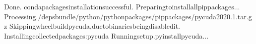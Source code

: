 \documentclass[a4paper,10pt,english]{sphinxmanual}
\begin{document}
\begin{sphinxVerbatim}[commandchars=\\\{\}]
\PYGZhy{}\PYGZhy{}\PYGZhy{}\PYGZhy{}\PYGZhy{}\PYGZhy{}\PYGZhy{}\PYGZhy{}\PYGZhy{}\PYGZhy{}\PYGZhy{}\PYGZhy{}\PYGZhy{}\PYGZhy{}\PYGZhy{}\PYGZhy{}\PYGZhy{}\PYGZhy{}\PYGZhy{}\PYGZhy{}\PYGZhy{}\PYGZhy{}\PYGZhy{}\PYGZhy{}\PYGZhy{}\PYGZhy{}\PYGZhy{}\PYGZhy{}\PYGZhy{}\PYGZhy{}\PYGZhy{}\PYGZhy{}\PYGZhy{}\PYGZhy{}\PYGZhy{}\PYGZhy{}\PYGZhy{}\PYGZhy{}\PYGZhy{}\PYGZhy{}\PYGZhy{}\PYGZhy{}\PYGZhy{}\PYGZhy{}\PYGZhy{}\PYGZhy{}\PYGZhy{}\PYGZhy{}\PYGZhy{}\PYGZhy{}\PYGZhy{}\PYGZhy{}\PYGZhy{}\PYGZhy{}\PYGZhy{}\PYGZhy{}\PYGZhy{}\PYGZhy{}\PYGZhy{}\PYGZhy{}\PYGZhy{}\PYGZhy{}\PYGZhy{}\PYGZhy{}\PYGZhy{}\PYGZhy{}\PYGZhy{}\PYGZhy{}\PYGZhy{}\PYGZhy{}\PYGZhy{}\PYGZhy{}
Done.
condapackagesinstallationsuccessful.
\PYGZhy{}\PYGZhy{}\PYGZhy{}\PYGZhy{}\PYGZhy{}\PYGZhy{}\PYGZhy{}\PYGZhy{}\PYGZhy{}\PYGZhy{}\PYGZhy{}\PYGZhy{}\PYGZhy{}\PYGZhy{}\PYGZhy{}\PYGZhy{}\PYGZhy{}\PYGZhy{}\PYGZhy{}\PYGZhy{}\PYGZhy{}\PYGZhy{}\PYGZhy{}\PYGZhy{}\PYGZhy{}\PYGZhy{}\PYGZhy{}\PYGZhy{}\PYGZhy{}\PYGZhy{}\PYGZhy{}\PYGZhy{}\PYGZhy{}\PYGZhy{}\PYGZhy{}\PYGZhy{}\PYGZhy{}\PYGZhy{}\PYGZhy{}\PYGZhy{}\PYGZhy{}\PYGZhy{}\PYGZhy{}\PYGZhy{}\PYGZhy{}\PYGZhy{}\PYGZhy{}\PYGZhy{}\PYGZhy{}\PYGZhy{}\PYGZhy{}\PYGZhy{}\PYGZhy{}\PYGZhy{}\PYGZhy{}\PYGZhy{}\PYGZhy{}\PYGZhy{}\PYGZhy{}\PYGZhy{}\PYGZhy{}\PYGZhy{}\PYGZhy{}\PYGZhy{}\PYGZhy{}\PYGZhy{}\PYGZhy{}\PYGZhy{}\PYGZhy{}\PYGZhy{}\PYGZhy{}\PYGZhy{}
Preparingtoinstallallpippackages...
\PYGZhy{}\PYGZhy{}\PYGZhy{}\PYGZhy{}\PYGZhy{}\PYGZhy{}\PYGZhy{}\PYGZhy{}\PYGZhy{}\PYGZhy{}\PYGZhy{}\PYGZhy{}\PYGZhy{}\PYGZhy{}\PYGZhy{}\PYGZhy{}\PYGZhy{}\PYGZhy{}\PYGZhy{}\PYGZhy{}\PYGZhy{}\PYGZhy{}\PYGZhy{}\PYGZhy{}\PYGZhy{}\PYGZhy{}\PYGZhy{}\PYGZhy{}\PYGZhy{}\PYGZhy{}\PYGZhy{}\PYGZhy{}\PYGZhy{}\PYGZhy{}\PYGZhy{}\PYGZhy{}\PYGZhy{}\PYGZhy{}\PYGZhy{}\PYGZhy{}\PYGZhy{}\PYGZhy{}\PYGZhy{}\PYGZhy{}\PYGZhy{}\PYGZhy{}\PYGZhy{}\PYGZhy{}\PYGZhy{}\PYGZhy{}\PYGZhy{}\PYGZhy{}\PYGZhy{}\PYGZhy{}\PYGZhy{}\PYGZhy{}\PYGZhy{}\PYGZhy{}\PYGZhy{}\PYGZhy{}\PYGZhy{}\PYGZhy{}\PYGZhy{}\PYGZhy{}\PYGZhy{}\PYGZhy{}\PYGZhy{}\PYGZhy{}\PYGZhy{}\PYGZhy{}\PYGZhy{}\PYGZhy{}
Processing./deps\PYGZus{}bundle/python/python\PYGZus{}packages/pip\PYGZus{}packages/pycuda\PYGZhy{}2020.1.tar.gz
Skippingwheelbuildpycuda,duetobinariesbeingdisabledit.
Installingcollectedpackages:pycuda
Runningsetup.pyinstallpycuda...

\end{sphinxVerbatim}
\end{document}
